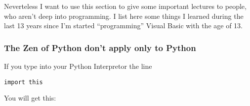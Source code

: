 \documentclass[letterpaper,10pt,english]{manual}
\begin{document}
Neverteless I want to use this section to give some important lectures to people, who aren't deep into programming.
I list here some things I learned during the last 13 years since I'm started ``programming'' Visual Basic with the age of 13.


\subsubsection{The Zen of Python don't apply only to Python}

If you type into your Python Interpretor the line

\begin{Verbatim}[commandchars=\\\{\}]
import this
\end{Verbatim}

You will get this:
\end{document}
